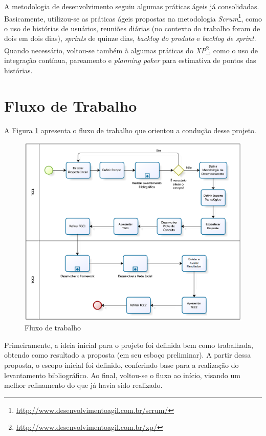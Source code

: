 A metodologia de desenvolvimento seguiu algumas práticas ágeis já consolidadas. Basicamente, utilizou-se as práticas ágeis propostas na metodologia \textit{Scrum}\footnote{\url{http://www.desenvolvimentoagil.com.br/scrum/}}, como o uso de histórias de usuários, reuniões diárias (no contexto do trabalho foram de dois em dois dias), \textit{sprints} de quinze dias, \textit{backlog do produto} e \textit{backlog de sprint}. Quando necessário, voltou-se também à algumas práticas do \textit{XP}\footnote{\url{http://www.desenvolvimentoagil.com.br/xp/}}, como o uso de integração contínua, pareamento e \textit{planning poker} para estimativa de pontos das histórias.

\section{Fluxo de Trabalho}

A Figura \ref{processo tcc} apresenta o fluxo de trabalho que orientou a condução desse projeto.

\begin{figure}[h]
	\centering
	\includegraphics[scale=0.6]{figuras/metodologia/processo_tcc.eps}
	\caption{Fluxo de trabalho}
	\label{processo tcc}
\end{figure}

Primeiramente, a ideia inicial para o projeto foi definida bem como trabalhada, obtendo como resultado a proposta (em seu esboço preliminar). A partir dessa proposta, o escopo inicial foi definido, conferindo base para a realização do levantamento bibliográfico. Ao final, voltou-se o fluxo ao início, visando um melhor refinamento do que já havia sido realizado.

